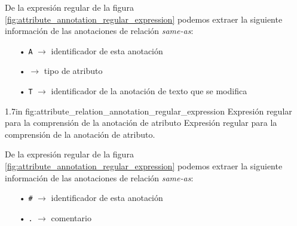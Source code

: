 De la expresión regular de la figura \ref{fig:attribute_annotation_regular_expression} podemos extraer la siguiente información de las anotaciones de relación \textit{same-as}:
\begin{itemize}
	\item[•] \texttt{A\OneOrMoreRegex} $\longrightarrow$ identificador de esta anotación
	\item[•] \texttt{\OneOrMoreRegex} $\longrightarrow$ tipo de atributo
	\item[•] \texttt{T\OneOrMoreRegex} $\longrightarrow$ identificador de la anotación de texto que se modifica
\end{itemize}

\begin{annexample}
[backgroundcolor=white]
{1.7in}
{fig:attribute_relation_annotation_regular_expression}
{Expresión regular para la comprensión de la anotación de atributo}
{Expresión regular para la comprensión de la anotación de atributo.}
	\StartingRegex{} \EndingRegex
\end{annexample}

De la expresión regular de la figura \ref{fig:attribute_annotation_regular_expression} podemos extraer la siguiente información de las anotaciones de relación \textit{same-as}:
\begin{itemize}
	\item[•] \texttt{\#\ZeroOrMoreRegex} $\longrightarrow$ identificador de esta anotación
	\item[•] \texttt{.\ZeroOrMoreRegex} $\longrightarrow$ comentario
\end{itemize}

